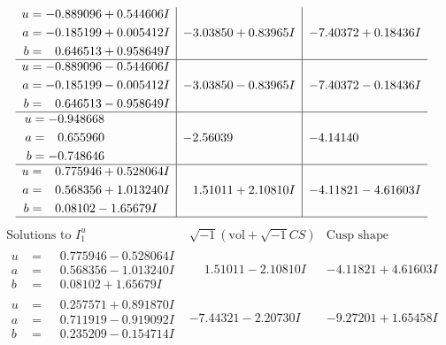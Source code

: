 \documentclass[1p]{elsarticle_modified}
\theoremstyle{definition}
\newcommand{\I}{\sqrt{-1}}
\begin{document}
$$\begin{array}{c|c|c}
\begin{aligned}
u &= -0.889096 + 0.544606 I \\
a &= -0.185199 + 0.005412 I \\
b &= \phantom{-}0.646513 + 0.958649 I\end{aligned}
 & -3.03850 + 0.83965 I & -7.40372 + 0.18436 I \\ \hline\begin{aligned}
u &= -0.889096 - 0.544606 I \\
a &= -0.185199 - 0.005412 I \\
b &= \phantom{-}0.646513 - 0.958649 I\end{aligned}
 & -3.03850 - 0.83965 I & -7.40372 - 0.18436 I \\ \hline\begin{aligned}
u &= -0.948668\phantom{ +0.000000I} \\
a &= \phantom{-}0.655960\phantom{ +0.000000I} \\
b &= -0.748646\phantom{ +0.000000I}\end{aligned}
 & -2.56039\phantom{ +0.000000I} & -4.14140\phantom{ +0.000000I} \\ \hline\begin{aligned}
u &= \phantom{-}0.775946 + 0.528064 I \\
a &= \phantom{-}0.568356 + 1.013240 I \\
b &= \phantom{-}0.08102 - 1.65679 I\end{aligned}
 & \phantom{-}1.51011 + 2.10810 I & -4.11821 - 4.61603 I\\
 \hline 
 \end{array}$$\newpage$$\begin{array}{c|c|c}  
\text{Solutions to }I^u_{1}& \I (\text{vol} + \sqrt{-1}CS) & \text{Cusp shape}\\
 \hline 
\begin{aligned}
u &= \phantom{-}0.775946 - 0.528064 I \\
a &= \phantom{-}0.568356 - 1.013240 I \\
b &= \phantom{-}0.08102 + 1.65679 I\end{aligned}
 & \phantom{-}1.51011 - 2.10810 I & -4.11821 + 4.61603 I \\ \hline\begin{aligned}
u &= \phantom{-}0.257571 + 0.891870 I \\
a &= \phantom{-}0.711919 - 0.919092 I \\
b &= \phantom{-}0.235209 - 0.154714 I\end{aligned}
 & -7.44321 - 2.20730 I & -9.27201 + 1.65458 I \\ \hline\begin{aligned}

\end{aligned}
\end{array}$$
\end{document}
